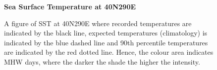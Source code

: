 \begin{figure}[H]
\centering
    \textbf{Sea Surface Temperature at 40N290E}\par
            \caption{A figure of SST at 40N290E where recorded temperatures are indicated by the black line, expected temperatures (climatology) is indicated by the blue dashed line and 90th percentile temperatures are indicated by the red dotted line. Hence, the colour area indicates MHW days, where the darker the shade the higher the intensity. \cite{MHWtracker}}
            \label{fig:}
\end{figure}